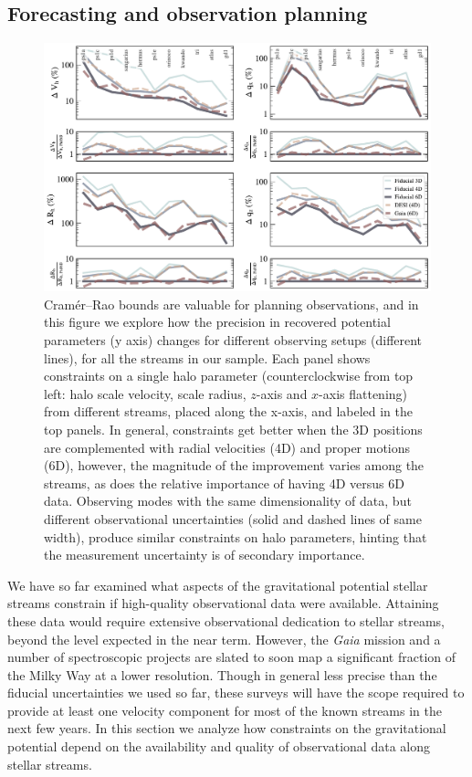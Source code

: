 \documentclass[modern]{aastex61}
\begin{document}
\subsection{Forecasting and observation planning}
\label{sec:forecast}
\begin{figure}
\begin{center}
\includegraphics[width=\textwidth]{obsmode_comparison.pdf}
\caption{Cram\'er--Rao bounds are valuable for planning observations, and in this figure we explore how the precision in recovered potential parameters (y axis) changes for different observing setups (different lines), for all the streams in our sample.
Each panel shows constraints on a single halo parameter (counterclockwise from top left: halo scale velocity, scale radius, $z$-axis and $x$-axis flattening) from different streams, placed along the x-axis, and labeled in the top panels.
In general, constraints get better when the 3D positions are complemented with radial velocities (4D) and proper motions (6D), however, the magnitude of the improvement varies among the streams, as does the relative importance of having 4D versus 6D data.
Observing modes with the same dimensionality of data, but different observational uncertainties (solid and dashed lines of same width), produce similar constraints on halo parameters, hinting that the measurement uncertainty is of secondary importance. 
}
\label{fig:obsmodes}
\end{center}
\end{figure}

We have so far examined what aspects of the gravitational potential stellar streams constrain if high-quality observational data were available.
Attaining these data would require extensive observational dedication to stellar streams, beyond the level expected in the near term.
However, the \emph{Gaia} mission and a number of spectroscopic projects are slated to soon map a significant fraction of the Milky Way at a lower resolution.
Though in general less precise than the fiducial uncertainties we used so far, these surveys will have the scope required to provide at least one velocity component for most of the known streams in the next few years.
In this section we analyze how constraints on the gravitational potential depend on the availability and quality of observational data along stellar streams. 
\end{document}
